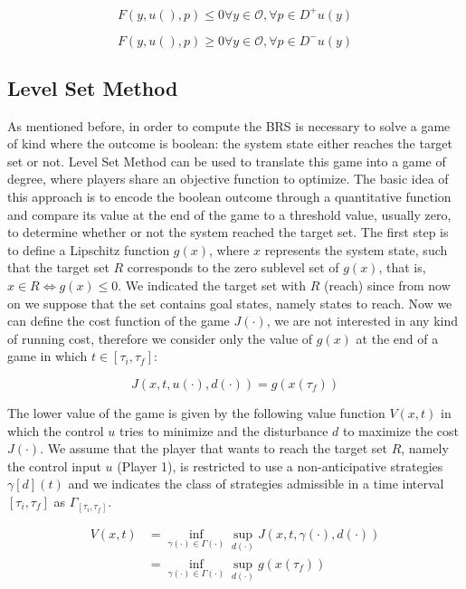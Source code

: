 \begin{equation}
	F(y,u(),p)\leq 0 \forall y \in \mathcal{O}, \forall p \in D^+ u(y)
\end{equation}

\begin{equation}
	F(y,u(),p)\geq 0 \forall y \in \mathcal{O}, \forall p \in D^- u(y)
\end{equation}


\subsection{Level Set Method}
As mentioned before, in order to compute the BRS is necessary to solve a game of kind where the outcome is boolean: the system state either reaches the target set or not. Level Set Method can be used to translate this game into a game of degree, where players share an objective function to optimize. The basic idea of this approach is to encode the boolean outcome through a quantitative function and compare its value at the end of the game to a threshold value, usually zero, to determine whether or not the system reached the target set.
The first step is to define a Lipschitz function $g(x)$, where $x$ represents the system state, such that the target set $R$ corresponds to the zero sublevel set of $g(x)$, that is, $x\in R \Leftrightarrow g(x) \leq 0$. We indicated the target set with $R$ (reach) since from now on we suppose that the set contains goal states, namely states to reach. Now we can define the cost function of the game $J(\cdot)$, we are not interested in any kind of running cost, therefore we consider only the value of $g(x)$ at the end of a game in which $t \in [\tau_i, \tau_f]$:

\begin{equation}
\label{eq:j_level_set}
    J(x, t, u(\cdot), d(\cdot)) = g(x(\tau_f))
\end{equation}
					
The lower value of the game is given by the following value function $V(x,t)$ in which the control $u$ tries to minimize and the disturbance $d$ to maximize the cost $J(\cdot)$.
We assume that the player that wants to reach the target set $R$, namely the control input $u$ (Player 1), is restricted to use a non-anticipative strategies $\gamma[d](t)$ and we indicates the class of strategies admissible in a time interval $[\tau_i, \tau_f]$ as $\Gamma_{[\tau_i, \tau_f]}$.

\begin{equation}
\begin{split}
    V(x, t) 
    & = \inf_{\gamma(\cdot) \in \Gamma(\cdot) } \sup_{d(\cdot)} J(x, t, \gamma(\cdot), d(\cdot))    \\
    & = \inf_{\gamma(\cdot) \in \Gamma(\cdot) } \sup_{d(\cdot)} g(x(\tau_f))
\end{split}
\end{equation}


